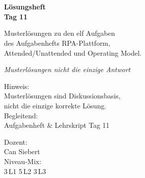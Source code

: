 \documentclass[11pt,a4paper,oneside]{article}
\newcommand{\caveatfontfallback}{\itshape}
\newcommand\caveatfont{\caveatfontfallback}%
\begin{document}
\begin{titlepage}
  \pagestyle{empty}
  \vspace*{1.5cm}
  \\[2pt]
  \noindent{\color{lpAccent}\rule{\linewidth}{1.2pt}}\\[4pt]

  \vspace{3cm}
  {\sffamily\fontsize{30}{34}\selectfont\bfseries\color{lpInk}L\"osungsheft\\Tag 11\par}

  \vspace{0.7cm}
  {\sffamily\large\color{lpGray}Musterl\"osungen zu den elf Aufgaben\\des Aufgabenhefts \textendash{} RPA-Plattform,\\Attended/Unattended und Operating Model.\par}

  \vspace{1.5cm}
  {\caveatfont\LARGE\color{lpGreen}Musterl\"osungen \textperiodcentered{} nicht die einzige Antwort}\par

  \vfill

  \noindent\begin{minipage}{0.55\linewidth}
    {\sffamily\footnotesize\color{lpGray}Hinweis:}\\
    {\sffamily\small\color{lpInk}Musterl\"osungen sind Diskussionsbasis,\\nicht die einzige korrekte L\"osung.}\\[10pt]
    {\sffamily\footnotesize\color{lpGray}Begleitend:}\\
    {\sffamily\small\color{lpInk}Aufgabenheft \& Lehrskript Tag 11}
  \end{minipage}\hfill
  \begin{minipage}{0.4\linewidth}
    \raggedleft
    {\sffamily\footnotesize\color{lpGray}Dozent:}\\
    {\sffamily\small\color{lpInk}Can Siebert}\\[10pt]
    {\sffamily\footnotesize\color{lpGray}Niveau-Mix:}\\
    {\sffamily\small\color{lpInk}3\,L1 \textperiodcentered{} 5\,L2 \textperiodcentered{} 3\,L3}
  \end{minipage}

  \vspace{0.5cm}
  \noindent{\color{lpAccent}\rule{\linewidth}{0.6pt}}
\end{titlepage}
\end{document}
